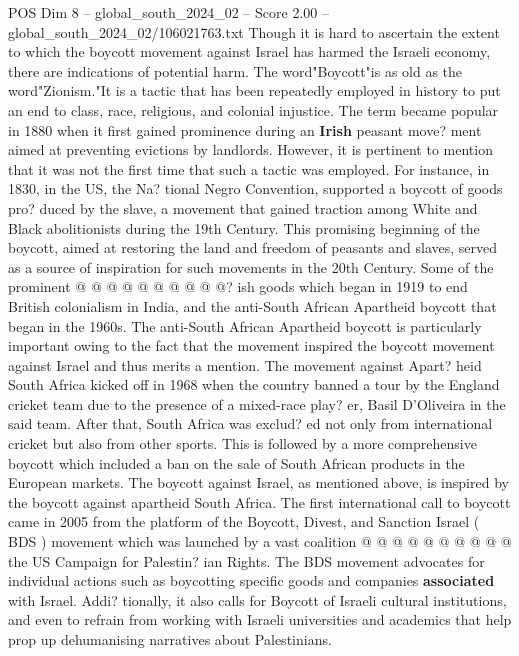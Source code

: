 \begin{textsample}{POS Dim 8 – global\_south\_2024\_02 – Score 2.00 – global\_south\_2024\_02/106021763.txt}  \label{ex:f8_pos_390}
Though it is hard to ascertain the extent to which the boycott movement against Israel has harmed the Israeli economy, there are indications of potential harm.
The word"Boycott"is as old as the word"Zionism."It is a tactic that has been repeatedly employed in history to put an end to class, race, religious, and colonial injustice.
The term became popular in 1880 when it first gained prominence during an \textbf{Irish} peasant move? ment aimed at preventing evictions by landlords.
However, it is pertinent to mention that it was not the first time that such a tactic was employed.
For instance, in 1830, in the US, the Na? tional Negro Convention, supported a boycott of goods pro? duced by the slave, a movement that gained traction among White and Black abolitionists during the 19th Century.
This promising beginning of the boycott, aimed at restoring the land and freedom of peasants and slaves, served as a source of inspiration for such movements in the 20th Century.
Some of the prominent @ @ @ @ @ @ @ @ @ @? ish goods which began in 1919 to end British colonialism in India, and the anti-South African Apartheid boycott that began in the 1960s.
The anti-South African Apartheid boycott is particularly important owing to the fact that the movement inspired the boycott movement against Israel and thus merits a mention.
The movement against Apart? heid South Africa kicked off in 1968 when the country banned a tour by the England cricket team due to the presence of a mixed-race play? er, Basil D'Oliveira in the said team.
After that, South Africa was exclud? ed not only from international cricket but also from other sports.
This is followed by a more comprehensive boycott which included a ban on the sale of South African products in the European markets.
The boycott against Israel, as mentioned above, is inspired by the boycott against apartheid South Africa.
The first international call to boycott came in 2005 from the platform of the Boycott, Divest, and Sanction Israel ( BDS ) movement which was launched by a vast coalition @ @ @ @ @ @ @ @ @ @ the US Campaign for Palestin? ian Rights.
The BDS movement advocates for individual actions such as boycotting specific goods and companies \textbf{associated} with Israel.
Addi? tionally, it also calls for Boycott of Israeli cultural institutions, and even to refrain from working with Israeli universities and academics that help prop up dehumanising narratives about Palestinians.

\end{textsample}
